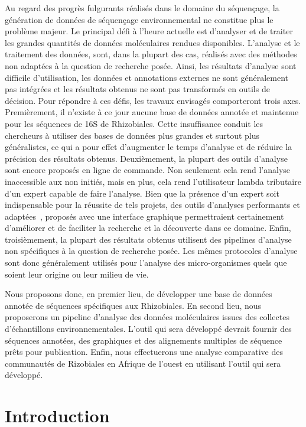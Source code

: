 \documentclass[12pt,twoside]{reedthesis}
\begin{document}
Au regard des progrès fulgurants réalisés dans le domaine du séquençage, la génération de données de séquençage environnemental ne constitue plus le problème majeur. Le principal défi à l'heure actuelle est d'analyser et de traiter les grandes quantités de données moléculaires rendues disponibles. L'analyse et le traitement des données, sont, dans la plupart des cas, réalisés avec des méthodes non adaptées à la question de recherche posée. Ainsi, les résultats d'analyse sont difficile d'utilisation, les données et annotations externes ne sont généralement pas intégrées et les résultats obtenus ne sont pas transformés en outils de décision. Pour répondre à ces défis, les travaux envisagés comporteront trois axes.
Premièrement, il n'existe à ce jour aucune base de données annotée et maintenue pour les séquences de 16S de Rhizobiales. Cette insuffisance conduit les chercheurs à utiliser des bases de données plus grandes et surtout plus généralistes, ce qui a pour effet d'augmenter le temps d'analyse et de réduire la précision des résultats obtenus.
Deuxièmement, la plupart des outils d'analyse sont encore proposés en ligne de commande. Non seulement cela rend l'analyse inaccessible aux non initiés, mais en plus, cela rend l'utilisateur lambda tributaire d'un expert capable de faire l'analyse. Bien que la présence d'un expert soit indispensable pour la réussite de tels projets, des outils d'analyses performants et adaptées~, proposés avec une interface graphique permettraient certainement d'améliorer et de faciliter la recherche et la découverte dans ce domaine.
Enfin, troisièmement, la plupart des résultats obtenus utilisent des pipelines d'analyse non spécifiques à la question de recherche posée. Les mêmes protocoles d'analyse sont donc généralement utilisés pour l'analyse des micro-organismes quels que soient leur origine ou leur milieu de vie.

Nous proposons donc, en premier lieu, de développer une base de données annotée de séquences spécifiques aux Rhizobiales. En second lieu, nous proposerons un pipeline d'analyse des données moléculaires issues des collectes d'échantillons environnementales. L'outil qui sera développé devrait fournir des séquences annotées, des graphiques et des alignements multiples de séquence prêts pour publication. Enfin, nous effectuerons une analyse comparative des communautés de Rizobiales en Afrique de l'ouest en utilisant l'outil qui sera développé.

\hypertarget{introduction}{%
\chapter*{Introduction}\label{introduction}}
\end{document}
